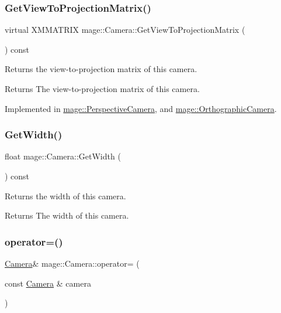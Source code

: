 \subsubsection{\texorpdfstring{Get\+View\+To\+Projection\+Matrix()}{GetViewToProjectionMatrix()}}
{\footnotesize\ttfamily virtual X\+M\+M\+A\+T\+R\+IX mage\+::\+Camera\+::\+Get\+View\+To\+Projection\+Matrix (\begin{DoxyParamCaption}{ }\end{DoxyParamCaption}) const\hspace{0.3cm}{\ttfamily [pure virtual]}}

Returns the view-\/to-\/projection matrix of this camera.

\begin{DoxyReturn}{Returns}
The view-\/to-\/projection matrix of this camera. 
\end{DoxyReturn}


Implemented in \hyperlink{classmage_1_1_perspective_camera_a83a38a4e8180707df2323130f9cee4a5}{mage\+::\+Perspective\+Camera}, and \hyperlink{classmage_1_1_orthographic_camera_aedd86e56a0f7bc967ad8d9be2631a0cf}{mage\+::\+Orthographic\+Camera}.

\hypertarget{classmage_1_1_camera_a2285655605035118861297b2449a3443}{}\label{classmage_1_1_camera_a2285655605035118861297b2449a3443} 
\subsubsection{\texorpdfstring{Get\+Width()}{GetWidth()}}
{\footnotesize\ttfamily float mage\+::\+Camera\+::\+Get\+Width (\begin{DoxyParamCaption}{ }\end{DoxyParamCaption}) const}

Returns the width of this camera.

\begin{DoxyReturn}{Returns}
The width of this camera. 
\end{DoxyReturn}
\hypertarget{classmage_1_1_camera_ae16a5f66b80f7fa771475aa1eb099634}{}\label{classmage_1_1_camera_ae16a5f66b80f7fa771475aa1eb099634} 
\subsubsection{\texorpdfstring{operator=()}{operator=()}}
{\footnotesize\ttfamily \hyperlink{classmage_1_1_camera}{Camera}\& mage\+::\+Camera\+::operator= (\begin{DoxyParamCaption}\item[{const \hyperlink{classmage_1_1_camera}{Camera} \&}]{camera }\end{DoxyParamCaption})}

